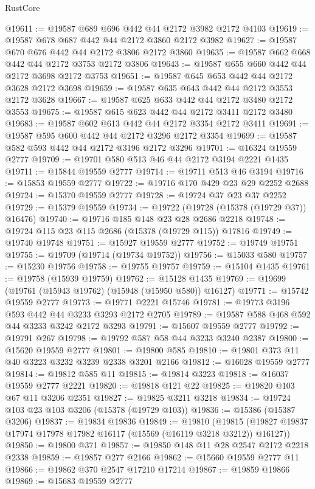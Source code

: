 \begin{lexlean}{RustCore}
\begin{coremodule}
@19611 := @19587 @689 @696 @442 @44 @2172 @3982 @2172 @4103
@19619 := @19587 @678 @687 @442 @44 @2172 @3860 @2172 @3982
@19627 := @19587 @670 @676 @442 @44 @2172 @3806 @2172 @3860
@19635 := @19587 @662 @668 @442 @44 @2172 @3753 @2172 @3806
@19643 := @19587 @655 @660 @442 @44 @2172 @3698 @2172 @3753
@19651 := @19587 @645 @653 @442 @44 @2172 @3628 @2172 @3698
@19659 := @19587 @635 @643 @442 @44 @2172 @3553 @2172 @3628
@19667 := @19587 @625 @633 @442 @44 @2172 @3480 @2172 @3553
@19675 := @19587 @615 @623 @442 @44 @2172 @3411 @2172 @3480
@19683 := @19587 @602 @613 @442 @44 @2172 @3354 @2172 @3411
@19691 := @19587 @595 @600 @442 @44 @2172 @3296 @2172 @3354
@19699 := @19587 @582 @593 @442 @44 @2172 @3196 @2172 @3296
@19701 := @16324 @19559 @2777
@19709 := @19701 @580 @513 @46 @44 @2172 @3194 @2221 @1435
@19711 := @15844 @19559 @2777
@19714 := @19711 @513 @46 @3194
@19716 := @15853 @19559 @2777
@19722 := @19716 @170 @429 @23 @29 @2252 @2688
@19724 := @15370 @19559 @2777
@19728 := @19724 @37 @23 @37 @2252
@19729 := @15379 @19559
@19734 := @19722 (@19728 (@15378 (@19729 @37)) @16476)
@19740 := @19716 @185 @148 @23 @28 @2686 @2218
@19748 := @19724 @115 @23 @115 @2686 (@15378 (@19729 @115)) @17816
@19749 := @19740 @19748
@19751 := @15927 @19559 @2777
@19752 := @19749 @19751
@19755 := @19709 (@19714 (@19734 @19752))
@19756 := @15033 @580
@19757 := @15230 @19756
@19758 := @19755 @19757
@19759 := @15104 @1435
@19761 := @19758 (@15939 @19759)
@19762 := @15128 @1435
@19769 := @19699 (@19761 (@15943 @19762) (@15948 (@15950 @580)) @16127)
@19771 := @15742 @19559 @2777
@19773 := @19771 @2221 @15746
@19781 := @19773 @3196 @593 @442 @44 @3233 @3293 @2172 @2705
@19789 := @19587 @588 @468 @592 @44 @3233 @3242 @2172 @3293
@19791 := @15607 @19559 @2777
@19792 := @19791 @267
@19798 := @19792 @587 @58 @44 @3233 @3240 @2387
@19800 := @15620 @19559 @2777
@19801 := @19800 @585
@19810 := @19801 @373 @11 @40 @3223 @3232 @3239 @2338 @3201 @2166
@19812 := @16028 @19559 @2777
@19814 := @19812 @585 @11
@19815 := @19814 @3223
@19818 := @16037 @19559 @2777 @2221
@19820 := @19818 @121 @22
@19825 := @19820 @103 @67 @11 @3206 @2351
@19827 := @19825 @3211 @3218
@19834 := @19724 @103 @23 @103 @3206 (@15378 (@19729 @103))
@19836 := @15386 (@15387 @3206)
@19837 := @19834 @19836
@19849 := @19810
    (@19815 (@19827 @19837 @17974 @17978 @17982 @16117 (@15569 (@16119 @3218 @3212)) @16127))
@19850 := @19800 @371
@19857 := @19850 @148 @11 @28 @2547 @2172 @2218 @2338
@19859 := @19857 @277 @2166
@19862 := @15660 @19559 @2777 @11
@19866 := @19862 @370 @2547 @17210 @17214
@19867 := @19859 @19866
@19869 := @15683 @19559 @2777

\end{coremodule}
\end{lexlean}
